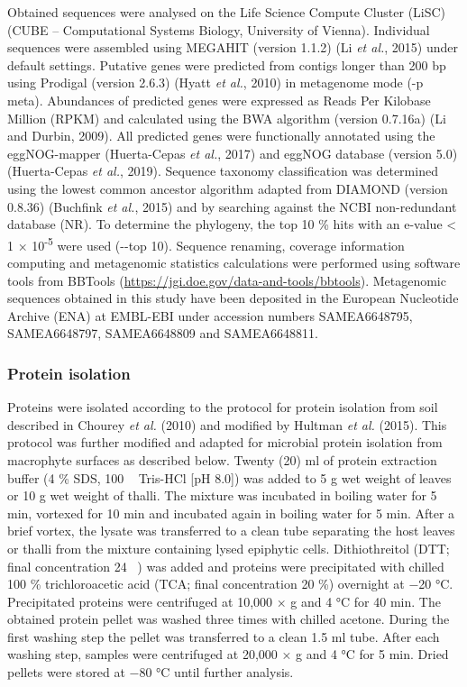 \documentclass[12pt,]{article}
\begin{document}
Obtained sequences were analysed on the Life Science Compute Cluster
(LiSC) (CUBE -- Computational Systems Biology, University of Vienna).
Individual sequences were assembled using MEGAHIT (version 1.1.2) (Li
\emph{et al.}, 2015) under default settings. Putative genes were
predicted from contigs longer than 200 bp using Prodigal (version 2.6.3)
(Hyatt \emph{et al.}, 2010) in metagenome mode (-p meta). Abundances of
predicted genes were expressed as Reads Per Kilobase Million (RPKM) and
calculated using the BWA algorithm (version 0.7.16a) (Li and Durbin,
2009). All predicted genes were functionally annotated using the
eggNOG-mapper (Huerta-Cepas \emph{et al.}, 2017) and eggNOG database
(version 5.0) (Huerta-Cepas \emph{et al.}, 2019). Sequence taxonomy
classification was determined using the lowest common ancestor algorithm
adapted from DIAMOND (version 0.8.36) (Buchfink \emph{et al.}, 2015) and
by searching against the NCBI non-redundant database (NR). To determine
the phylogeny, the top 10 \si{\percent} hits with an e-value \textless{}
1 × 10\textsuperscript{-5} were used (-\/-top 10). Sequence renaming,
coverage information computing and metagenomic statistics calculations
were performed using software tools from BBTools
(\url{https://jgi.doe.gov/data-and-tools/bbtools}). Metagenomic
sequences obtained in this study have been deposited in the European
Nucleotide Archive (ENA) at EMBL-EBI under accession numbers
SAMEA6648795, SAMEA6648797, SAMEA6648809 and SAMEA6648811.

\hypertarget{protein-isolation}{%
\subsubsection{Protein isolation}\label{protein-isolation}}

Proteins were isolated according to the protocol for protein isolation
from soil described in Chourey \emph{et al.} (2010) and modified by
Hultman \emph{et al.} (2015). This protocol was further modified and
adapted for microbial protein isolation from macrophyte surfaces as
described below. Twenty (20) \si{\ml} of protein extraction buffer (4
\si{\percent} SDS, 100 \si{\milli\Molar} Tris-HCl {[}pH 8.0{]}) was
added to 5 \si{\g} wet weight of leaves or 10 \si{\g} wet weight of
thalli. The mixture was incubated in boiling water for 5 \si{\minute},
vortexed for 10 \si{\minute} and incubated again in boiling water for 5
\si{\minute}. After a brief vortex, the lysate was transferred to a
clean tube separating the host leaves or thalli from the mixture
containing lysed epiphytic cells. Dithiothreitol (DTT; final
concentration 24 \si{\milli\Molar}) was added and proteins were
precipitated with chilled 100 \si{\percent} trichloroacetic acid (TCA;
final concentration 20 \si{\percent}) overnight at \num{-20}
\si{\degreeCelsius}. Precipitated proteins were centrifuged at 10,000 ×
g and 4 \si{\degreeCelsius} for 40 \si{\minute}. The obtained protein
pellet was washed three times with chilled acetone. During the first
washing step the pellet was transferred to a clean 1.5 \si{\ml} tube.
After each washing step, samples were centrifuged at 20,000 × g and 4
\si{\degreeCelsius} for 5 \si{\minute}. Dried pellets were stored at
\num{-80} \si{\degreeCelsius} until further analysis.
\end{document}
